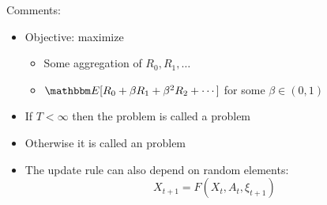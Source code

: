 \begin{frame}
    
    Comments:
    \begin{itemize}
        \item Objective: maximize 
            \vspace{0.3em}
            \vspace{0.3em}
        \begin{itemize}
            \item Some aggregation of $R_0, R_1, \ldots$
            \vspace{0.3em}
            \vspace{0.3em}
            \item \Eg $\EE [ R_0 + \beta R_1 + \beta^2 R_2 + \cdots]$ for
                some $\beta \in (0, 1)$
        \end{itemize}
            \vspace{0.3em}
            \vspace{0.3em}
            \vspace{0.3em}
        \item If $T < \infty$ then the problem is called a  problem  
            \vspace{0.3em}
            \vspace{0.3em}
            \vspace{0.3em}
            \vspace{0.3em}
        \item Otherwise it is called an  problem
            \vspace{0.3em}
            \vspace{0.3em}
            \vspace{0.3em}
            \vspace{0.3em}
            \vspace{0.3em}
        \item The update rule can also depend on random elements:
            \begin{equation*}
                X_{t+1} = F(X_t, A_t, \xi_{t+1})
            \end{equation*}
    \end{itemize}

\end{frame}


